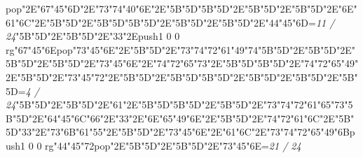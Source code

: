 pop{}\ipa\char"2E\ipa\char"67\ipa\char"45\ipa\char"6D\ipa\char"2E\ipa\char"73\ipa\char"74\ipa\char"40\ipa\char"6E\ipa\char"2E\ipa\char"5B\quad\quad\quad\ipa\char"5D\bigskip\ipa\char"5B\quad\ipa\char"5D\ipa\char"2E\ipa\char"5B\quad\quad\quad\quad\ipa\char"5D\ipa\char"2E\ipa\char"5B\quad\quad\ipa\char"5D\ipa\char"2E\ipa\char"6E\ipa\char"61\ipa\char"6C\ipa\char"2E\ipa\char"5B\quad\quad\ipa\char"5D\ipa\char"2E\ipa\char"5B\quad\quad\quad\quad\quad\quad\ipa\char"5D\bigskip\ipa\char"5B\quad\quad\quad\ipa\char"5D\ipa\char"2E\ipa\char"5B\quad\quad\ipa\char"5D\ipa\char"2E\ipa\char"5B\quad\quad\quad\ipa\char"5D\ipa\char"2E\ipa\char"44\ipa\char"45\ipa\char"6D\bigskip\vfill\footline={\hfill\tenrm\it 11 / 24}\eject\null\vfill\ipa\char"5B\quad\quad\quad\ipa\char"5D\ipa\char"2E\ipa\char"5B\quad\quad\quad\quad\ipa\char"5D\ipa\char"2E\ipa\char"33\ipa\char"2E\pdfcolorstack\match push{1 0 0 rg}\ipa\char"67\ipa\char"45\ipa\char"6E\pdfcolorstack\match pop{}\bigskip\ipa\char"73\ipa\char"45\ipa\char"6E\ipa\char"2E\ipa\char"5B\quad\quad\quad\ipa\char"5D\ipa\char"2E\ipa\char"73\ipa\char"74\ipa\char"72\ipa\char"61\ipa\char"49\ipa\char"74\bigskip\ipa\char"5B\quad\quad\ipa\char"5D\ipa\char"2E\ipa\char"5B\quad\quad\quad\quad\ipa\char"5D\ipa\char"2E\ipa\char"5B\quad\ipa\char"5D\ipa\char"2E\ipa\char"5B\quad\quad\quad\quad\ipa\char"5D\ipa\char"2E\ipa\char"73\ipa\char"45\ipa\char"6E\ipa\char"2E\ipa\char"74\ipa\char"72\ipa\char"65\ipa\char"73\ipa\char"2E\ipa\char"5B\quad\quad\quad\ipa\char"5D\bigskip\ipa\char"5B\quad\ipa\char"5D\ipa\char"2E\ipa\char"74\ipa\char"72\ipa\char"65\ipa\char"49\ipa\char"2E\ipa\char"5B\quad\quad\ipa\char"5D\ipa\char"2E\ipa\char"73\ipa\char"45\ipa\char"72\ipa\char"2E\ipa\char"5B\quad\quad\ipa\char"5D\ipa\char"2E\ipa\char"5B\quad\quad\quad\quad\quad\quad\ipa\char"5D\bigskip\ipa\char"5B\quad\quad\quad\ipa\char"5D\ipa\char"2E\ipa\char"5B\quad\quad\ipa\char"5D\ipa\char"2E\ipa\char"5B\quad\quad\quad\ipa\char"5D\ipa\char"2E\ipa\char"5B\quad\quad\quad\ipa\char"5D\bigskip\vfill\footline={\hfill\tenrm\it 4 / 24}\eject\null\vfill\ipa\char"5B\quad\quad\quad\ipa\char"5D\ipa\char"2E\ipa\char"5B\quad\quad\quad\quad\ipa\char"5D\ipa\char"2E\ipa\char"61\ipa\char"2E\ipa\char"5B\quad\quad\quad\ipa\char"5D\bigskip\ipa\char"5B\quad\quad\quad\ipa\char"5D\ipa\char"2E\ipa\char"5B\quad\quad\quad\ipa\char"5D\ipa\char"2E\ipa\char"73\ipa\char"74\ipa\char"72\ipa\char"61\ipa\char"65\ipa\char"73\bigskip\ipa\char"5B\quad\quad\ipa\char"5D\ipa\char"2E\ipa\char"64\ipa\char"45\ipa\char"6C\ipa\char"66\ipa\char"2E\ipa\char"33\ipa\char"2E\ipa\char"6E\ipa\char"65\ipa\char"49\ipa\char"6E\ipa\char"2E\ipa\char"5B\quad\quad\quad\ipa\char"5D\ipa\char"2E\ipa\char"74\ipa\char"72\ipa\char"61\ipa\char"6C\ipa\char"2E\ipa\char"5B\quad\quad\quad\ipa\char"5D\bigskip\ipa\char"33\ipa\char"2E\ipa\char"73\ipa\char"6B\ipa\char"61\ipa\char"55\ipa\char"2E\ipa\char"5B\quad\quad\ipa\char"5D\ipa\char"2E\ipa\char"73\ipa\char"45\ipa\char"6E\ipa\char"2E\ipa\char"61\ipa\char"6C\ipa\char"2E\ipa\char"73\ipa\char"74\ipa\char"72\ipa\char"65\ipa\char"49\ipa\char"6B\bigskip\pdfcolorstack\match push{1 0 0 rg}\ipa\char"44\ipa\char"45\ipa\char"72\pdfcolorstack\match pop{}\ipa\char"2E\ipa\char"5B\quad\quad\ipa\char"5D\ipa\char"2E\ipa\char"5B\quad\quad\quad\ipa\char"5D\ipa\char"2E\ipa\char"73\ipa\char"45\ipa\char"6E\bigskip\vfill\footline={\hfill\tenrm\it 21 / 24}\bye